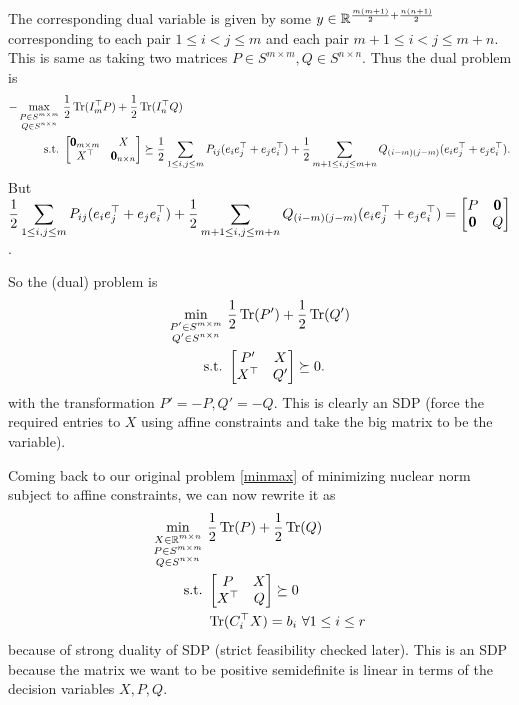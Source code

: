 \begin{enumerate}[leftmargin=*]
The corresponding dual variable is given by some $y\in \mathbb{R}^{\frac{m(m+1)}{2}+\frac{n(n+1)}{2}}$ corresponding to each pair $1\le i<j\le m$ and each pair $m+1\le i<j\le m+n$. This is same as taking two matrices $P\in S^{m\times m},Q\in S^{n\times n}$. Thus the dual problem is
\begin{align*}
-\max_{\substack{P\in S^{m\times m}\\Q\in S^{n\times n}}}&~ \frac12\operatorname{Tr}(I_{m}^{\top}P) + \frac12\operatorname{Tr}(I_{n}^{\top}Q)\\
\text{s.t.}&~ \begin{bmatrix}\pmb 0_{m\times m}&X\\X^{\top}&\pmb0_{n\times n}\end{bmatrix} \succeq \frac{1}{2}\sum_{1\le i,j\le m} P_{ij}(e_{i}e_{j}^{\top}+ e_{j}e_{i}^{\top}) + \frac{1}{2}\sum_{m+1\le i,j\le m+n} Q_{(i-m)(j-m)}(e_{i}e_{j}^{\top}+ e_{j}e_{i}^{\top}).
\end{align*}
But $\displaystyle \frac{1}{2}\sum_{1\le i,j\le m} P_{ij}(e_{i}e_{j}^{\top}+ e_{j}e_{i}^{\top}) + \frac{1}{2}\sum_{m+1\le i,j\le m+n} Q_{(i-m)(j-m)}(e_{i}e_{j}^{\top}+ e_{j}e_{i}^{\top}) = \begin{bmatrix}P&\pmb 0\\\pmb 0&Q\end{bmatrix}$.

So the (dual) problem is \begin{equation}\label{dual}\begin{aligned}
\min_{\substack{P'\in S^{m\times m}\\Q'\in S^{n\times n}}}&~ \frac12\operatorname{Tr}(P') + \frac12\operatorname{Tr}(Q')\\
\text{s.t.}&~ \begin{bmatrix} P'&X\\X^{\top}&Q'\end{bmatrix} \succeq 0.
\end{aligned}\end{equation}
with the transformation $P'=-P, Q'=-Q$. This is clearly an SDP (force the required entries to $X$ using affine constraints and take the big matrix to be the variable).

Coming back to our original problem \ref{minmax} of minimizing nuclear norm subject to affine constraints, we can now rewrite it as 
\begin{align*}
\min_{\substack{X\in\mathbb{R}^{m\times n}\\P\in S^{m\times m}\\ Q\in S^{n\times n}}} &~ \frac12\operatorname{Tr}(P) + \frac12\operatorname{Tr}(Q)\\
\text{s.t.} &~ \begin{bmatrix} P&X\\X^{\top}&Q\end{bmatrix} \succeq 0\\
&~ \operatorname{Tr}(C_{i}^{\top}X) = b_{i}~\forall 1\le i\le r
\end{align*}
because of strong duality of SDP (strict feasibility checked later).
This is an SDP because the matrix we want to be positive semidefinite is linear in terms of the decision variables $X,P,Q$.


\end{enumerate}

